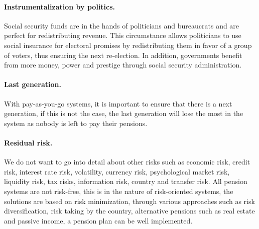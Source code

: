 

\paragraph{Instrumentalization by politics.} Social security funds are in the hands of politicians and bureaucrats and are perfect for redistributing revenue. This circumstance allows politicians to use social insurance for electoral promises by redistributing them in favor of a group of voters, thus ensuring the next re-election. In addition, governments benefit from more money, power and prestige through social security administration. \cite{zweifel_insurance_2012}

\paragraph{Last generation.} With pay-as-you-go systems, it is important to ensure that there is a next generation, if this is not the case, the last generation will lose the most in the system as nobody is left to pay their pensions.

\paragraph{Residual risk.} 
We do not want to go into detail about other risks such as economic risk, credit risk, interest rate risk, volatility, currency risk, psychological market risk, liquidity risk, tax risks, information risk, country and transfer risk.
All pension systems are not risk-free, this is in the nature of risk-oriented systems, the solutions are based on risk minimization, through various approaches such as risk diversification, risk taking by the country, alternative pensions such as real estate and passive income, a pension plan can be well implemented.


